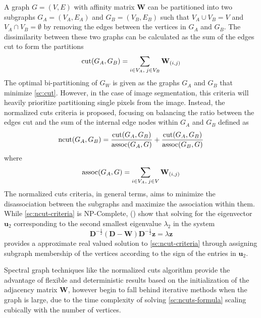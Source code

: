 A graph $G = (V,E)$ with affinity matrix $\mathbf{W}$ can be partitioned into two subgraphs $G_A = (V_A, E_A)$ and $G_B = (V_B, E_B)$ such that $V_A \cup V_B = V$ and $V_A \cap V_B = \emptyset$ by removing the edges between the vertices in $G_A$ and $G_B$. The dissimilarity between these two graphs can be calculated as the sum of the edges cut to form the partitions
\begin{equation}
    \label{sc:cut}
    \operatorname*{\text{cut}}(G_A,G_B) = \sum_{i \in V_A,\;j \in V_B}{\mathbf{W}_{(i,j)}}
\end{equation}
The optimal bi-partitioning of $G_W$ is given as the graphs $G_A$ and $G_B$ that minimize \eqref{sc:cut}. However, in the case of image segmentation, this criteria will heavily prioritize partitioning single pixels from the image. Instead, the normalized cuts criteria is proposed, focusing on balancing the ratio between the edges cut and the sum of the internal edge nodes within $G_A$ and $G_B$ defined as 
\begin{equation}
    \label{sc:ncut-criteria}
    \operatorname*{\text{ncut}}(G_A, G_B) = \frac{\operatorname*{\text{cut}}(G_A, G_B)}{\operatorname*{\text{assoc}}(G_A, G)} + \frac{\operatorname*{\text{cut}}(G_A, G_B)}{\operatorname*{\text{assoc}}(G_B, G)}
\end{equation}
where 
\begin{equation}
    \label{sc:assoc}
    \operatorname*{\text{assoc}}(G_A, G) = \sum_{i \in V_A,\;j \in V}{\mathbf{W}_{(i,j)}} 
\end{equation}
The normalized cuts criteria, in general terms, aims to minimize the disassociation between the subgraphs and maximize the association within them. While \eqref{sc:ncut-criteria} is NP-Complete, (\cite{NCUTS}) show that solving for the eigenvector $\mathbf{u}_2$ corresponding to the second smallest eigenvalue $\lambda_2$ in the system
\begin{equation}
    \label{sc:ncuts-formula}
    \mathbf{D}^{-\frac{1}{2}}(\mathbf{D} - \mathbf{W})\mathbf{D}^{-\frac{1}{2}}\mathbf{z} = \lambda \mathbf{z}
\end{equation}
provides a approximate real valued solution to \eqref{sc:ncut-criteria} through assigning subgraph membership of the vertices according to the sign of the entries in $\mathbf{u}_2$.

Spectral graph techniques like the normalized cuts algorithm provide the advantage of flexible and deterministic results based on the initialization of the adjacency matrix $\mathbf{W}$, however begin to fall behind iterative methods when the graph is large, due to the time complexity of solving \eqref{sc:ncuts-formula} scaling cubically with the number of vertices. 